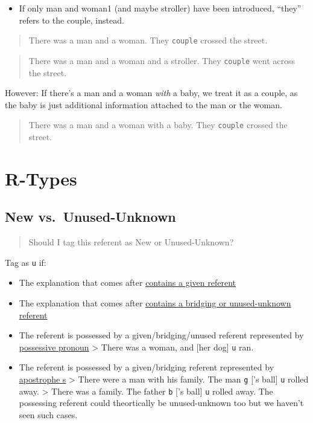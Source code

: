 \documentclass[
]{book}
\providecommand{\tightlist}{%
  \setlength{\itemsep}{0pt}\setlength{\parskip}{0pt}}
\begin{document}
\begin{itemize}
\tightlist
\item
  If only man and woman1 (and maybe stroller) have been introduced,
  ``they'' refers to the couple, instead.
\end{itemize}

\begin{quote}
There was a man and a woman.
They \texttt{couple} crossed the street.
\end{quote}

\begin{quote}
There was a man and a woman and a stroller.
They \texttt{couple} went across the street.
\end{quote}

However: If there's a man and a woman \emph{with} a baby,
we treat it as a couple,
as the baby is just additional information
attached to the man or the woman.

\begin{quote}
There was a man and a woman with a baby.
They \texttt{couple} crossed the street.
\end{quote}

\hypertarget{r-types}{%
\section{R-Types}\label{r-types}}

\hypertarget{new-vs.-unused-unknown}{%
\subsection{New vs.~Unused-Unknown}\label{new-vs.-unused-unknown}}

\begin{quote}
Should I tag this referent as New or Unused-Unknown?
\end{quote}

Tag as \texttt{u} if:

\begin{itemize}
\tightlist
\item
  The explanation that comes after \protect\hyperlink{explanation-given-referent}{contains a given referent}
\item
  The explanation that comes after \protect\hyperlink{explanation-bridging-or-unused-unknown-referent}{contains a bridging or unused-unknown referent}
\item
  The referent is possessed by a given/bridging/unused referent represented by \protect\hyperlink{possessive-pronouns}{possessive pronoun}
  \textgreater{} There was a woman, and {[}her dog{]} \texttt{u} ran.
\item
  The referent is possessed by a given/bridging referent represented by \protect\hyperlink{apostrophe-s}{apostrophe s}
  \textgreater{} There were a man with his family. The man \texttt{g} {[}'s ball{]} \texttt{u} rolled away.
  \textgreater{} There was a family. The father \texttt{b} {[}'s ball{]} \texttt{u} rolled away.
  The possessing referent could theortically be unused-unknown too but we haven't seen such cases.
\end{itemize}
\end{document}
